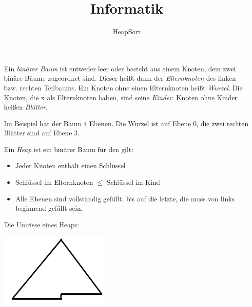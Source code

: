 \documentclass{beamer}
\begin{document}
\title{Informatik}   
\author{HeapSort} 
\date{}
\frame{\titlepage} 


\begin{frame}[fragile]


Ein \textit{binärer Baum} ist entweder leer oder besteht aus einem Knoten, dem zwei binäre Bäume zugeordnet sind. \pause Dieser heißt dann der \textit{Elternknoten} des linken bzw. rechten Teilbaums. \pause Ein Knoten ohne einen Elternknoten heißt \textit{Wurzel}. \pause Die Knoten, die x als Elternknoten haben, sind seine \textit{Kinder}. Knoten ohne Kinder heißen
 \textit{Blätter}. \pause

Im Beispiel hat der Baum 4 Ebenen. Die Wurzel ist auf Ebene 0, die zwei rechten Blätter sind auf Ebene 3.
\end{frame}

\begin{frame}[fragile]
Ein \textit{Heap} ist ein binärer Baum für den gilt:  
\begin{itemize}
\item Jeder Knoten enthält einen Schlüssel \\ \pause
\item Schlüssel im Elternknoten $\le$ Schlüssel im Kind \\ \pause 
\item Alle Ebenen sind vollständig gefüllt, bis auf die letzte, die muss von links beginnend gefüllt sein. \pause
\end{itemize}

Die Umrisse eines Heaps: 

\includegraphics[scale=0.6]{heap.png}
\end{frame}
\end{document}

